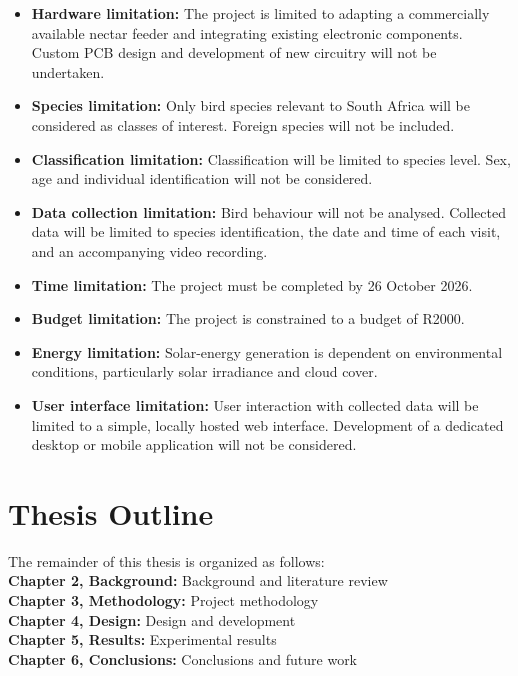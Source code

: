 \begin{itemize}
\item \textbf{Hardware limitation:} The project is limited to adapting a commercially available nectar feeder and integrating existing electronic components. Custom PCB design and development of new circuitry will not be undertaken.
\item \textbf{Species limitation:} Only bird species relevant to South Africa will be considered as classes of interest. Foreign species will not be included.
\item \textbf{Classification limitation:} Classification will be limited to species level. Sex, age and individual identification will not be considered.
\item \textbf{Data collection limitation:} Bird behaviour will not be analysed. Collected data will be limited to species identification, the date and time of each visit, and an accompanying video recording.
\item \textbf{Time limitation:} The project must be completed by 26 October 2026.
\item \textbf{Budget limitation:} The project is constrained to a budget of R2000.
\item \textbf{Energy limitation:} Solar-energy generation is dependent on environmental conditions, particularly solar irradiance and cloud cover.
\item \textbf{User interface limitation:} User interaction with collected data will be limited to a simple, locally hosted web interface. Development of a dedicated desktop or mobile application will not be considered.
\end{itemize}

\section[Outline]{Thesis Outline}
The remainder of this thesis is organized as follows:\\
\textbf{Chapter 2, Background:} Background and literature review\\
\textbf{Chapter 3, Methodology:} Project methodology\\
\textbf{Chapter 4, Design:} Design and development\\
\textbf{Chapter 5, Results:} Experimental results\\
\textbf{Chapter 6, Conclusions:} Conclusions and future work